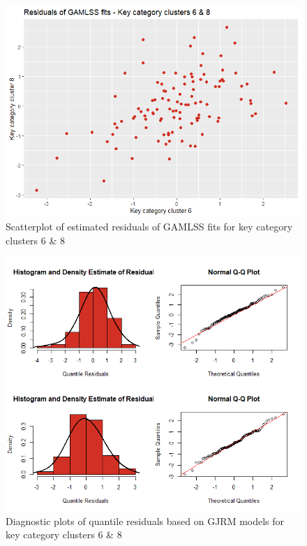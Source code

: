 


\begin{figure}[H]
\centering
  \includegraphics[width=0.45\linewidth]{figures/scatter_res_kcc_68.png}
  \caption{Scatterplot of estimated residuals of GAMLSS fits for key category clusters 6 \& 8}
  \label{fig:scatter_res_kcc_68}
\end{figure}






\begin{figure}[H]
\centering
  \includegraphics[width=0.95\linewidth]{figures/res_hist_qqplot_68.png}
  \caption{Diagnostic plots of quantile residuals based on \ac{GJRM} models for key category clusters 6 \& 8}
  \label{fig:res_hist_qqplot_68}
\end{figure}


